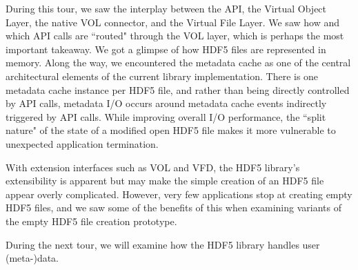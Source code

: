 During this tour, we saw the interplay between the API, the Virtual Object Layer, the native VOL connector, and the Virtual File Layer. We saw how and which API calls are ``routed" through the VOL layer, which is perhaps the most important takeaway. We got a glimpse of how HDF5 files are represented in memory. Along the way, we encountered the metadata cache as one of the central architectural elements of the current library implementation. There is one metadata cache instance per HDF5 file, and rather than being directly controlled by API calls, metadata I/O occurs around metadata cache events indirectly triggered by API calls. While improving overall I/O performance, the ``split nature" of the state of a modified open HDF5 file makes it more vulnerable to unexpected application termination.

With extension interfaces such as VOL and VFD, the HDF5 library's extensibility is apparent but may make the simple creation of an HDF5 file appear overly complicated. However, very few applications stop at creating empty HDF5 files, and we saw some of the benefits of this when examining variants of the empty HDF5 file creation prototype.

During the next tour, we will examine how the HDF5 library handles user (meta-)data.
